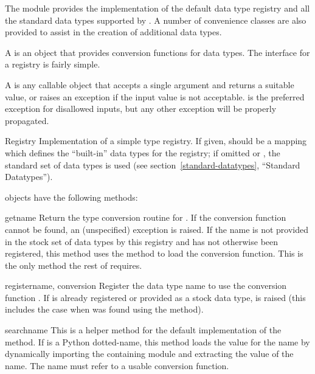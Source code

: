 \documentclass{howto}
\begin{document}

The  module provides the implementation of
the default data type registry and all the standard data types
supported by .  A number of convenience classes are
also provided to assist in the creation of additional data types.

A  is an object that provides conversion
functions for data types.  The interface for a registry is fairly
simple.

A  is any callable object that accepts a
single argument and returns a suitable value, or raises an exception
if the input value is not acceptable.   is the
preferred exception for disallowed inputs, but any other exception
will be properly propagated.

\begin{classdesc}{Registry}{}
  Implementation of a simple type registry.  If given, 
  should be a mapping which defines the ``built-in'' data types for
  the registry; if omitted or , the standard set of data
  types is used (see section~\ref{standard-datatypes}, ``Standard
   Datatypes'').
\end{classdesc}

 objects have the following methods:

\begin{methoddesc}{get}{name}
  Return the type conversion routine for .  If the
  conversion function cannot be found, an (unspecified) exception is
  raised.  If the name is not provided in the stock set of data types
  by this registry and has not otherwise been registered, this method
  uses the  method to load the conversion function.
  This is the only method the rest of  requires.
\end{methoddesc}

\begin{methoddesc}{register}{name, conversion}
  Register the data type name  to use the conversion
  function .  If  is already registered or
  provided as a stock data type,  is raised
  (this includes the case when  was found using the
   method).
\end{methoddesc}

\begin{methoddesc}{search}{name}
  This is a helper method for the default implementation of the
   method.  If  is a Python dotted-name, this
  method loads the value for the name by dynamically importing the
  containing module and extracting the value of the name.  The name
  must refer to a usable conversion function.
\end{methoddesc}
\end{document}
